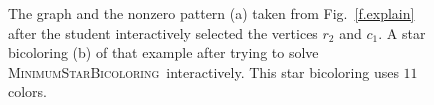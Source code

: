 \documentclass[12pt, oneside]{book}
\newcommand{\MinStaBic}{\textsc{MinimumStarBicoloring}}
\begin{document}
\begin{figure}
\centering
{}
 \hfill
{}%
\caption{The graph and the nonzero pattern (a) taken from Fig.~\protect\ref{f.explain}
after the student interactively selected the vertices $r_2$
and $c_1$. A star bicoloring (b) of that example after trying to solve
\MinStaBic\ interactively. This star bicoloring uses $11$ colors.}
\label{f.arrow-shaped2}
\end{figure}
\end{document}
